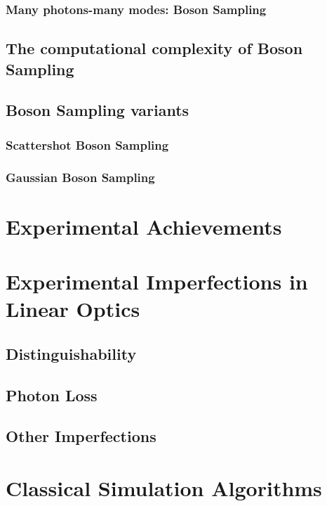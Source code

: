 \subsubsection{Many photons-many modes: Boson Sampling}

\subsection{The computational complexity of Boson Sampling}

\subsection{Boson Sampling variants}

\subsubsection{Scattershot Boson Sampling}

\subsubsection{Gaussian Boson Sampling}

\section{Experimental Achievements}

\section{Experimental Imperfections in Linear Optics}

\subsection{Distinguishability}

\subsection{Photon Loss}

\subsection{Other Imperfections}

\section{Classical Simulation Algorithms}

